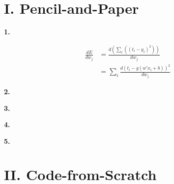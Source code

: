 

\usepackage{graphicx, amssymb, amsmath, listings, float, mathtools}
\usepackage{color, url}
\lstset{language = Python}
\lstset{breaklines}
\lstset{extendedchars=false}

\oddsidemargin 0in
\evensidemargin 0in
\textwidth 6.5in
\topmargin -0.6in
\textheight 9.0in




\section*{\Large I. Pencil-and-Paper}
\begin{description}
\item{\bf \large 1. }

\begin{equation}
\begin{split}
	\frac{dE}{dw_j} & = \frac{d(\sum_i{((t_i - y_i)^2)})}{dw_j} \\
					& = \sum_i{\frac{d(t_i - g(w' x_i + b))^2}{dw_j}}
\end{split}
\end{equation}


\item{\bf \large 2. }


\item{\bf \large 3. }


\item{\bf \large 4. }


\item{\bf \large 5. }

\end{description}

\newpage
\section*{\Large II. Code-from-Scratch}


